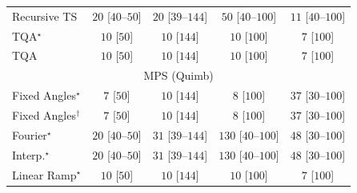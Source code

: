 \begin{tabular}{l|cccc|}
Recursive TS & {\cellcolor[HTML]{F5FBF2}} \color[HTML]{000000} $20$ [$40$--$50$] & {\cellcolor[HTML]{F5FBF2}} \color[HTML]{000000} $20$ [$39$--$144$] & {\cellcolor[HTML]{F0F9EC}} \color[HTML]{000000} $50$ [$40$--$100$] & {\cellcolor[HTML]{F6FCF4}} \color[HTML]{000000} $11$ [$40$--$100$] \\
TQA$^\star$ & {\cellcolor[HTML]{F7FCF5}} \color[HTML]{000000} $10$ [$50$] & {\cellcolor[HTML]{F7FCF5}} \color[HTML]{000000} $10$ [$144$] & {\cellcolor[HTML]{F7FCF5}} \color[HTML]{000000} $10$ [$100$] & {\cellcolor[HTML]{F7FCF5}} \color[HTML]{000000} $7$ [$100$] \\
TQA & {\cellcolor[HTML]{F7FCF5}} \color[HTML]{000000} $10$ [$50$] & {\cellcolor[HTML]{F7FCF5}} \color[HTML]{000000} $10$ [$144$] & {\cellcolor[HTML]{F7FCF5}} \color[HTML]{000000} $10$ [$100$] & {\cellcolor[HTML]{F7FCF5}} \color[HTML]{000000} $7$ [$100$] \\
\cline{1-5}
\multicolumn{5}{c}{\rule{0pt}{8pt}MPS (Quimb)} \\
\midrule
Fixed Angles$^\star$ & {\cellcolor[HTML]{F7FCF5}} \color[HTML]{000000} $7$ [$50$] & {\cellcolor[HTML]{F7FCF5}} \color[HTML]{000000} $10$ [$144$] & {\cellcolor[HTML]{F7FCF5}} \color[HTML]{000000} $8$ [$100$] & {\cellcolor[HTML]{F2FAEF}} \color[HTML]{000000} $37$ [$30$--$100$] \\
Fixed Angles$^\dagger$ & {\cellcolor[HTML]{F7FCF5}} \color[HTML]{000000} $7$ [$50$] & {\cellcolor[HTML]{F7FCF5}} \color[HTML]{000000} $10$ [$144$] & {\cellcolor[HTML]{F7FCF5}} \color[HTML]{000000} $8$ [$100$] & {\cellcolor[HTML]{F2FAEF}} \color[HTML]{000000} $37$ [$30$--$100$] \\
Fourier$^\star$ & {\cellcolor[HTML]{F5FBF2}} \color[HTML]{000000} $20$ [$40$--$50$] & {\cellcolor[HTML]{F3FAF0}} \color[HTML]{000000} $31$ [$39$--$144$] & {\cellcolor[HTML]{DFF3DA}} \color[HTML]{000000} $130$ [$40$--$100$] & {\cellcolor[HTML]{F0F9ED}} \color[HTML]{000000} $48$ [$30$--$100$] \\
Interp.$^\star$ & {\cellcolor[HTML]{F5FBF2}} \color[HTML]{000000} $20$ [$40$--$50$] & {\cellcolor[HTML]{F3FAF0}} \color[HTML]{000000} $31$ [$39$--$144$] & {\cellcolor[HTML]{DFF3DA}} \color[HTML]{000000} $130$ [$40$--$100$] & {\cellcolor[HTML]{F0F9ED}} \color[HTML]{000000} $48$ [$30$--$100$] \\
Linear Ramp$^\star$ & {\cellcolor[HTML]{F7FCF5}} \color[HTML]{000000} $10$ [$50$] & {\cellcolor[HTML]{F7FCF5}} \color[HTML]{000000} $10$ [$144$] & {\cellcolor[HTML]{F7FCF5}} \color[HTML]{000000} $10$ [$100$] & {\cellcolor[HTML]{F7FCF5}} \color[HTML]{000000} $7$ [$100$] \\

\end{tabular}
